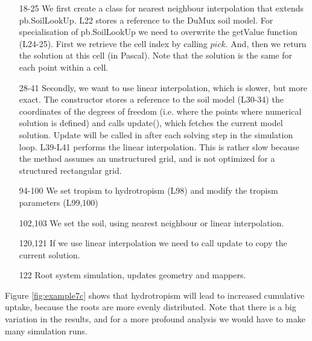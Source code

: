 \begin{itemize}
\item[18-25] We first create a class for nearest neighbour interpolation that extends pb.SoilLookUp. L22 stores a reference to the DuMux soil model. For specialisation of pb.SoilLookUp we need to overwrite the getValue function (L24-25). First we retrieve the cell index by calling $pick$. And, then we return the solution at this cell (in Pascal). Note that the solution is the same for each point within a cell. 
\item[28-41] Secondly, we want to use linear interpolation, which is slower, but more exact. The constructor stores a reference to the soil model (L30-34) the coordinates of the degrees of freedom (i.e. where the points where numerical solution is defined) and calls update(), which fetches the current model solution. Update will be called in after each solving step in the simulation loop. L39-L41 performs the linear interpolation. This is rather slow because the method assumes an unstructured grid, and is not optimized for a structured rectangular grid. 
\item[94-100] We set tropism to hydrotropism (L98) and modify the tropism parameters (L99,100)
\item[102,103] We set the soil, using nearest neighbour or linear interpolation.
\item[120,121] If we use linear interpolation we need to call update to copy the current solution. 
\item[122] Root system simulation, updates geometry and mappers.
\end{itemize}

Figure \ref{fig:example7c} shows that hydrotropism will lead to increased cumulative uptake, because the roots are more evenly distributed. Note that there is a big variation in the results, and for a more profound analysis we would have to make many simulation runs. 




